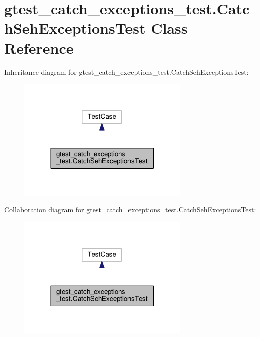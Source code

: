 \hypertarget{classgtest__catch__exceptions__test_1_1CatchSehExceptionsTest}{}\section{gtest\+\_\+catch\+\_\+exceptions\+\_\+test.\+Catch\+Seh\+Exceptions\+Test Class Reference}
\label{classgtest__catch__exceptions__test_1_1CatchSehExceptionsTest}


Inheritance diagram for gtest\+\_\+catch\+\_\+exceptions\+\_\+test.\+Catch\+Seh\+Exceptions\+Test\+:
\nopagebreak
\begin{figure}[H]
\begin{center}
\leavevmode
\includegraphics[width=233pt]{classgtest__catch__exceptions__test_1_1CatchSehExceptionsTest__inherit__graph}
\end{center}
\end{figure}


Collaboration diagram for gtest\+\_\+catch\+\_\+exceptions\+\_\+test.\+Catch\+Seh\+Exceptions\+Test\+:
\nopagebreak
\begin{figure}[H]
\begin{center}
\leavevmode
\includegraphics[width=233pt]{classgtest__catch__exceptions__test_1_1CatchSehExceptionsTest__coll__graph}
\end{center}
\end{figure}
